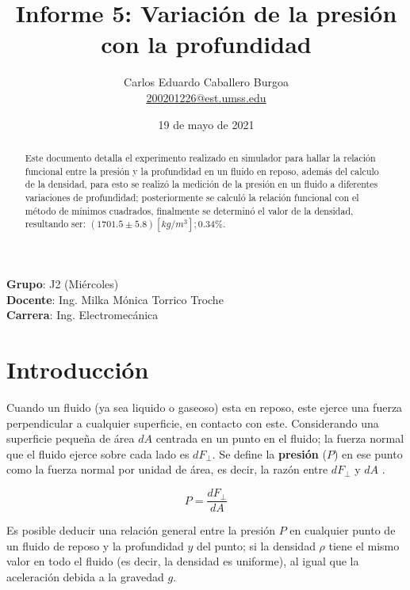 \documentclass[letter,11pt]{article}
\title{Informe 5: Variación de la presión \\
con la profundidad}
\author{Carlos Eduardo Caballero Burgoa \\
    \small{\href{mailto:200201226@est.umss.edu}{200201226@est.umss.edu}}
}
\date{19 de mayo de 2021}
\begin{document}
\maketitle
\begin{center}
    \textbf{Grupo}: J2 (Miércoles)\\
    \textbf{Docente}: Ing. Milka Mónica Torrico Troche\\
    \textbf{Carrera}: Ing. Electromecánica
\end{center}

\begin{abstract}
Este documento detalla el experimento realizado en simulador para hallar la
relación funcional entre la presión y la profundidad en un fluido en reposo,
además del calculo de la densidad, para esto se realizó la medición de la
presión en un fluido a diferentes variaciones de profundidad; posteriormente se
calculó la relación funcional con el método de mínimos cuadrados, finalmente se
determinó el valor de la densidad, resultando ser:
$(1701.5 \pm 5.8)[kg/m^3]; 0.34\%$.
\end{abstract}

\section{Introducción}

Cuando un fluido (ya sea liquido o gaseoso) esta en reposo, este ejerce una
fuerza perpendicular a cualquier superficie, en contacto con este. Considerando
una superficie pequeña de área $dA$ centrada en un punto en el fluido; la
fuerza normal que el fluido ejerce sobre cada lado es $dF_{\perp}$. Se define
la \textbf{presión} ($P$) en ese punto como la fuerza normal por unidad de
área, es decir, la razón entre $dF_{\perp}$ y $dA$ \cite{Young&Freedman}.

\begin{equation}
    P = \frac{dF_{\perp}}{dA}
\label{presion}
\end{equation}
\vspace{0.10cm}

Es posible deducir una relación general entre la presión $P$ en cualquier
punto de un fluido de reposo y la profundidad $y$ del punto; si la densidad
$\rho$ tiene el mismo valor en todo el fluido (es decir, la densidad es
uniforme), al igual que la aceleración debida a la gravedad $g$.
\end{document}
